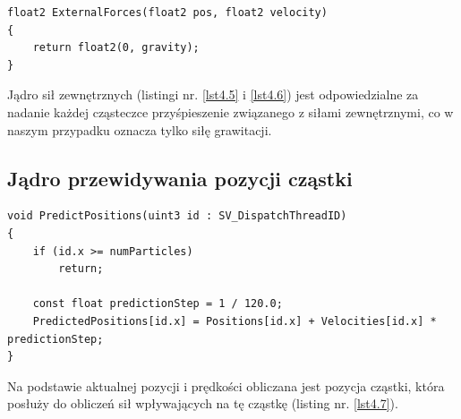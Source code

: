 \documentclass{article}
\begin{document}
\begin{lstlisting}[caption=Ciało funkcji ExternalForces(), label={lst4.6}]
float2 ExternalForces(float2 pos, float2 velocity)
{
	return float2(0, gravity);
}
\end{lstlisting}
\noindent
Jądro sił zewnętrznych (listingi nr. \ref{lst4.5} i \ref{lst4.6}) jest odpowiedzialne za nadanie każdej cząsteczce przyśpieszenie związanego z siłami zewnętrznymi, co w naszym przypadku oznacza tylko siłę grawitacji.\newline

\subsection{Jądro przewidywania pozycji cząstki}
\begin{lstlisting}[caption=Jądro przewidywania pozycji cząstki, label={lst4.7}]
void PredictPositions(uint3 id : SV_DispatchThreadID)
{
	if (id.x >= numParticles)
		return;

	const float predictionStep = 1 / 120.0;
	PredictedPositions[id.x] = Positions[id.x] + Velocities[id.x] * predictionStep;
}
\end{lstlisting}
\noindent
Na podstawie aktualnej pozycji i prędkości obliczana jest pozycja cząstki, która posłuży do obliczeń sił wpływających na tę cząstkę (listing nr. \ref{lst4.7}).\newline
\end{document}
